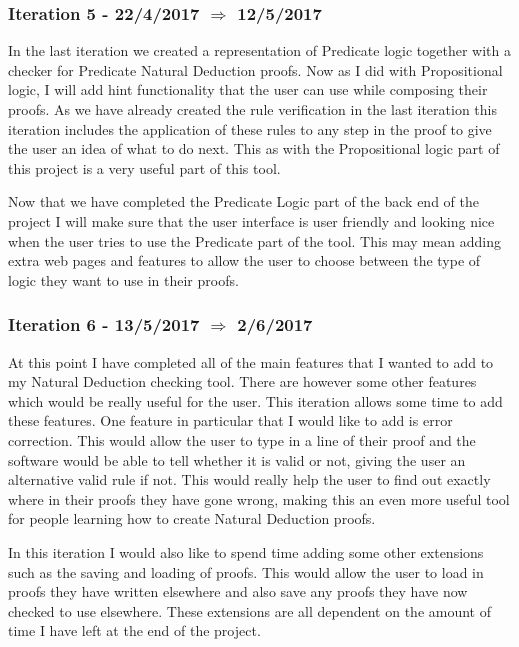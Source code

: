 \subsubsection{Iteration 5 - 22/4/2017 $\Rightarrow$ 12/5/2017}

In the last iteration we created a representation of Predicate logic together with a checker for Predicate Natural Deduction proofs. Now as I did with Propositional logic, I will add hint functionality that the user can use while composing their proofs. As we have already created the rule verification in the last iteration this iteration includes the application of these rules to any step in the proof to give the user an idea of what to do next. This as with the Propositional logic part of this project is a very useful part of this tool. 

Now that we have completed the Predicate Logic part of the back end of the project I will make sure that the user interface is user friendly and looking nice when the user tries to use the Predicate part of the tool. This may mean adding extra web pages and features to allow the user to choose between the type of logic they want to use in their proofs.

\subsubsection{Iteration 6 - 13/5/2017 $\Rightarrow$ 2/6/2017}

At this point I have completed all of the main features that I wanted to add to my Natural Deduction checking tool. There are however some other features which would be really useful for the user. This iteration allows some time to add these features. One feature in particular that I would like to add is error correction. This would allow the user to type in a line of their proof and the software would be able to tell whether it is valid or not, giving the user an alternative valid rule if not. This would really help the user to find out exactly where in their proofs they have gone wrong, making this an even more useful tool for people learning how to create Natural Deduction proofs.

In this iteration I would also like to spend time adding some other extensions such as the saving and loading of proofs. This would allow the user to load in proofs they have written elsewhere and also save any proofs they have now checked to use elsewhere. These extensions are all dependent on the amount of time I have left at the end of the project.

